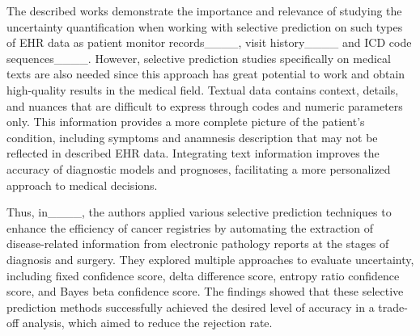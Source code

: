   The described works demonstrate the importance and relevance of studying the uncertainty quantification when working with selective prediction on such types of EHR data as patient monitor records____, visit history____ and ICD code sequences____. However, selective prediction studies specifically on medical texts are also needed since this approach has great potential to work and obtain high-quality results in the medical field. Textual data contains context, details, and nuances that are difficult to express through codes and numeric parameters only. This information provides a more complete picture of the patient's condition, including symptoms and anamnesis description that may not be reflected in described EHR data. Integrating text information improves the accuracy of diagnostic models and prognoses, facilitating a more personalized approach to medical decisions.

  Thus, in____, the authors applied various selective prediction techniques to enhance the efficiency of cancer registries by automating the extraction of disease-related information from electronic pathology reports at the stages of diagnosis and surgery. They explored multiple approaches to evaluate uncertainty, including fixed confidence score, delta difference score, entropy ratio confidence score, and Bayes beta confidence score. The findings showed that these selective prediction methods successfully achieved the desired level of accuracy in a trade-off analysis, which aimed to reduce the rejection rate.


